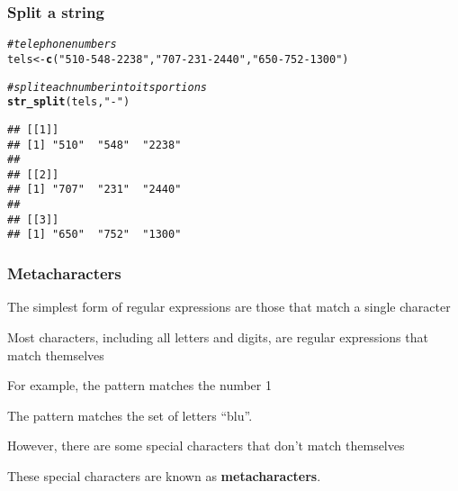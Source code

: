 \documentclass[12pt]{beamer}\usepackage[]{graphicx}\usepackage[]{color}
\makeatletter
\newcommand{\hlstr}[1]{\textcolor[rgb]{0.192,0.494,0.8}{#1}}%
\newcommand{\hlcom}[1]{\textcolor[rgb]{0.678,0.584,0.686}{\textit{#1}}}%
\newcommand{\hlstd}[1]{\textcolor[rgb]{0.345,0.345,0.345}{#1}}%
\newcommand{\hlkwb}[1]{\textcolor[rgb]{0.69,0.353,0.396}{#1}}%
\newcommand{\hlkwd}[1]{\textcolor[rgb]{0.737,0.353,0.396}{\textbf{#1}}}%
\newenvironment{kframe}{%
 \def\at@end@of@kframe{}%
 \ifinner\ifhmode%
  \def\at@end@of@kframe{\end{minipage}}%
  \begin{minipage}{\columnwidth}%
 \fi\fi%
 \def\FrameCommand##1{\hskip\@totalleftmargin \hskip-\fboxsep
 \colorbox{shadecolor}{##1}\hskip-\fboxsep
     \hskip-\linewidth \hskip-\@totalleftmargin \hskip\columnwidth}%
 \MakeFramed {\advance\hsize-\width
   \@totalleftmargin\z@ \linewidth\hsize
   \@setminipage}}%
 {\par\unskip\endMakeFramed%
 \at@end@of@kframe}
\newenvironment{knitrout}{}{} %
\makeatother
\begin{document}
\begin{frame}[fragile]
\frametitle{Split a string}

\begin{knitrout}\footnotesize
{}\color{fgcolor}\begin{kframe}
\begin{alltt}
\hlcom{# telephone numbers}
\hlstd{tels} \hlkwb{<-} \hlkwd{c}\hlstd{(}\hlstr{"510-548-2238"}\hlstd{,} \hlstr{"707-231-2440"}\hlstd{,} \hlstr{"650-752-1300"}\hlstd{)}

\hlcom{# split each number into its portions}
\hlkwd{str_split}\hlstd{(tels,} \hlstr{"-"}\hlstd{)}
\end{alltt}
\begin{verbatim}
## [[1]]
## [1] "510"  "548"  "2238"
## 
## [[2]]
## [1] "707"  "231"  "2440"
## 
## [[3]]
## [1] "650"  "752"  "1300"
\end{verbatim}
\end{kframe}
\end{knitrout}

\end{frame}


\begin{frame}
\begin{center}
\Huge{}
\end{center}
\end{frame}


\begin{frame}
\frametitle{Metacharacters}

\bi
  \item The simplest form of regular expressions are those that match a single character 
  \item Most characters, including all letters and digits, are regular expressions that match themselves
  \item For example, the pattern  matches the number 1
  \item The pattern  matches the set of letters ``blu''.
  \item However, there are some special characters that don't match themselves
  \item These special characters are known as \textbf{metacharacters}.
\ei

\end{frame}
\end{document}
